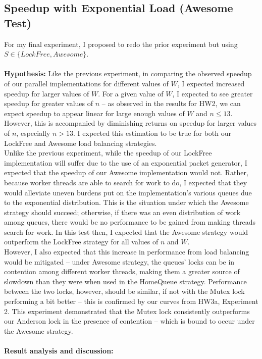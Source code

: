 \documentclass[]{article}
\begin{document}
\subsection{Speedup with Exponential Load (Awesome Test)}
For my final experiment, I proposed to redo the prior experiment but using $S \in \{LockFree, Awesome\}$.
\\\\
\textbf{Hypothesis:} Like the previous experiment, in comparing the observed speedup of our parallel implementations for different values of $W$, I expected increased speedup for larger values of $W$. For a given value of $W$, I expected to see greater speedup for greater values of $n$ -- as observed in the results for HW2, we can expect speedup to appear linear for large enough values of $W$ and $n \leq 13$. However, this is accompanied by diminishing returns on speedup for larger values of $n$, especially $n > 13$. I expected this estimation to be true for both our LockFree and Awesome load balancing strategies.
\\
Unlike the previous experiment, while the speedup of our LockFree implementation will suffer due to the use of an exponential packet generator, I expected that the speedup of our Awesome implementation  would not. Rather, because worker threads are able to search for work to do, I expected that they would alleviate uneven burdens put on the implementation's various queues due to the exponential distribution. This is the situation under which the Awesome strategy should succeed; otherwise, if there was an even distribution of work among queues, there would be no performance to be gained from making threads search for work. In this test then, I expected that the Awesome strategy would outperform the LockFree strategy for all values of $n$ and $W$.
\\
However, I also expected that this increase in performance from load balancing would be mitigated -- under Awesome strategy, the queues' locks can be in contention among different worker threads, making them a greater source of slowdown than they were when used in the HomeQueue strategy. Performance between the two locks, however, should be similar, if not with the Mutex lock performing a bit better -- this is confirmed by our curves from HW3a, Experiment 2. This experiment demonstrated that the Mutex lock consistently outperforms our Anderson lock in the presence of contention -- which is bound to occur under the Awesome strategy.
\\\\
\textbf{Result analysis and discussion:}

	
\end{document}
